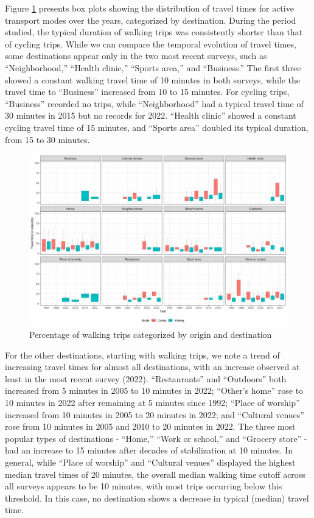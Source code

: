 \documentclass[preprint, 3p,
authoryear]{elsarticle} %
\begin{document}
Figure \ref{fig:figure-boxplot} presents box plots showing the
distribution of travel times for active transport modes over the years,
categorized by destination. During the period studied, the typical
duration of walking trips was consistently shorter than that of cycling
trips. While we can compare the temporal evolution of travel times, some
destinations appear only in the two most recent surveys, such as
``Neighborhood,'' ``Health clinic,'' ``Sports area,'' and ``Business.''
The first three showed a constant walking travel time of 10 minutes in
both surveys, while the travel time to ``Business'' increased from 10 to
15 minutes. For cycling trips, ``Business'' recorded no trips, while
``Neighborhood'' had a typical travel time of 30 minutes in 2015 but no
records for 2022. ``Health clinic'' showed a constant cycling travel
time of 15 minutes, and ``Sports area'' doubled its typical duration,
from 15 to 30 minutes.

\begin{figure}
\includegraphics[width=1\linewidth]{figures/destination_boxplots} \caption{Percentage of walking trips categorized by origin and destination}\label{fig:figure-boxplot}
\end{figure}

For the other destinations, starting with walking trips, we note a trend
of increasing travel times for almost all destinations, with an increase
observed at least in the most recent survey (2022). ``Restaurants'' and
``Outdoors'' both increased from 5 minutes in 2005 to 10 minutes in
2022; ``Other's home'' rose to 10 minutes in 2022 after remaining at 5
minutes since 1992; ``Place of worship'' increased from 10 minutes in
2005 to 20 minutes in 2022; and ``Cultural venues'' rose from 10 minutes
in 2005 and 2010 to 20 minutes in 2022. The three most popular types of
destinations - ``Home,'' ``Work or school,'' and ``Grocery store'' - had
an increase to 15 minutes after decades of stabilization at 10 minutes.
In general, while ``Place of worship'' and ``Cultural venues'' displayed
the highest median travel times of 20 minutes, the overall median
walking time cutoff across all surveys appears to be 10 minutes, with
most trips occurring below this threshold. In this case, no destination
shows a decrease in typical (median) travel time.
\end{document}
